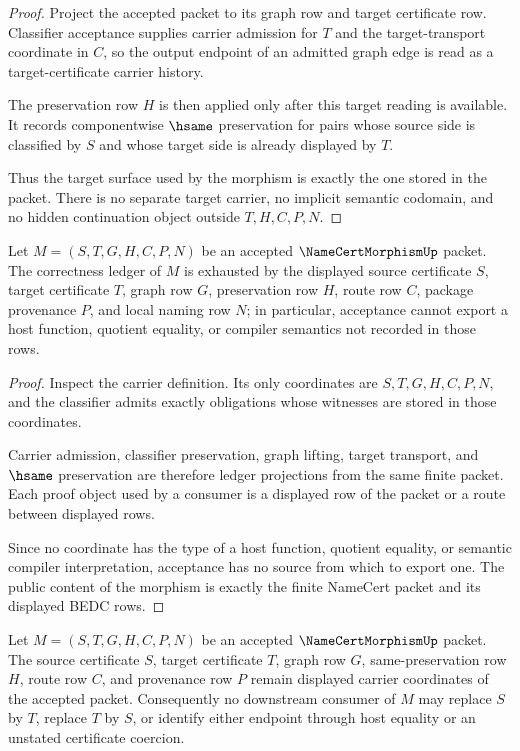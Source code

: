 \begin{proof}
Project the accepted packet to its graph row and target certificate row. Classifier acceptance supplies carrier admission for $T$ and the target-transport coordinate in $C$, so the output endpoint of an admitted graph edge is read as a target-certificate carrier history.

The preservation row $H$ is then applied only after this target reading is available. It records componentwise $\hsame$ preservation for pairs whose source side is classified by $S$ and whose target side is already displayed by $T$.

Thus the target surface used by the morphism is exactly the one stored in the packet. There is no separate target carrier, no implicit semantic codomain, and no hidden continuation object outside $T,H,C,P,N$.
\end{proof}

\begin{theorem}
\label{thm:namecert-morphism-ledger-nonescape-obligation}
Let $M=(S,T,G,H,C,P,N)$ be an accepted $\NameCertMorphismUp$ packet. The correctness ledger of $M$ is exhausted by the displayed source certificate $S$, target certificate $T$, graph row $G$, preservation row $H$, route row $C$, package provenance $P$, and local naming row $N$; in particular, acceptance cannot export a host function, quotient equality, or compiler semantics not recorded in those rows.
\end{theorem}

\begin{proof}
Inspect the carrier definition. Its only coordinates are $S,T,G,H,C,P,N$, and the classifier admits exactly obligations whose witnesses are stored in those coordinates.

Carrier admission, classifier preservation, graph lifting, target transport, and $\hsame$ preservation are therefore ledger projections from the same finite packet. Each proof object used by a consumer is a displayed row of the packet or a route between displayed rows.

Since no coordinate has the type of a host function, quotient equality, or semantic compiler interpretation, acceptance has no source from which to export one. The public content of the morphism is exactly the finite NameCert packet and its displayed BEDC rows.
\end{proof}

\begin{theorem}
\label{thm:namecert-morphism-source-target-separation}
Let $M=(S,T,G,H,C,P,N)$ be an accepted $\NameCertMorphismUp$ packet. The source certificate $S$, target certificate $T$, graph row $G$, same-preservation row $H$, route row $C$, and provenance row $P$ remain displayed carrier coordinates of the accepted packet. Consequently no downstream consumer of $M$ may replace $S$ by $T$, replace $T$ by $S$, or identify either endpoint through host equality or an unstated certificate coercion.
\end{theorem}


